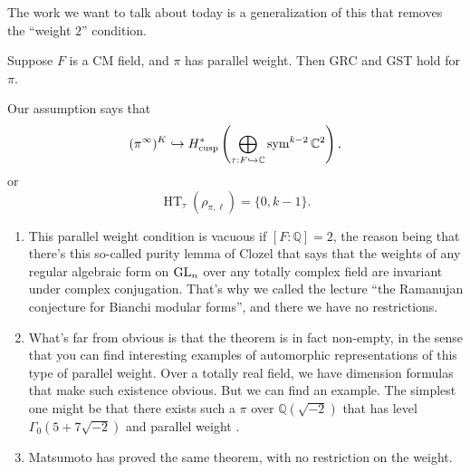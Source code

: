 \documentclass[reqno]{amsart} 
\begin{document}
The work we want to talk about today is a generalization of this that removes the ``weight $2$'' condition.
\begin{theorem}
  Suppose $F$ is a CM field, and $\pi$ has parallel weight.  Then GRC and GST hold for $\pi$.
\end{theorem}
Our assumption says that
\begin{equation*}
  (\pi^\infty )^K \hookrightarrow H^\ast_{\operatorname{cusp}} \left( \bigoplus_{\tau : F \hookrightarrow \mathbb{C}}
    \operatorname{sym}^{k - 2} \mathbb{C}^2\right),
\end{equation*}
or
\begin{equation*}
  \operatorname{H T}_\tau\left(\rho_{\pi, \ell}\right) = \{0, k - 1\}.
\end{equation*}

\begin{remark}
  \begin{enumerate}
  \item\label{enumerate:cnpp2drvjk} This parallel weight condition is vacuous if $[F: \mathbb{Q}] = 2$, the reason being that there's this so-called purity lemma of Clozel that says that the weights of any regular algebraic form on $\operatorname{GL}_n$ over any totally complex field are invariant under complex conjugation.  That's why we called the lecture ``the Ramanujan conjecture for Bianchi modular forms'', and there we have no restrictions.
  \item\label{enumerate:cnpp2dtmbo} What's far from obvious is that the theorem is in fact non-empty, in the sense that you can find interesting examples of automorphic representations of this type of parallel weight.  Over a totally real field, we have dimension formulas that make such existence obvious.  But we can find an example.  The simplest one might be that there exists such a $\pi$ over $\mathbb{Q}(\sqrt{- 2})$ that has level $\Gamma_0(5 + 7 \sqrt{- 2})$ and parallel weight .
  \item Matsumoto \cite{2023arXiv2312.01551} has proved the same theorem, with no restriction on the weight.
  \end{enumerate}
\end{remark}
\end{document}

